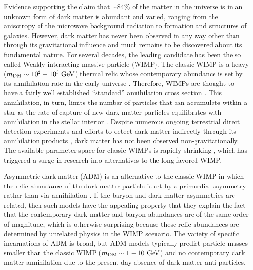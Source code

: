 \documentclass[useAMS,usenatbib]{mnras}
\begin{document}
  Evidence supporting the claim that $\sim$84\% of the matter in the universe is in 
  an unknown form of dark matter is abundant and varied, ranging from the 
  anisotropy of the microwave background radiation to formation and structures of galaxies. 
  However, dark matter has never been observed in any way other than through its 
  gravitational influence and much remains to be discovered about its fundamental nature. 
  For several decades, the leading candidate has been the so called Weakly-interacting massive particle (WIMP). 
  The classic WIMP is a heavy ($m_{\mathrm{DM}} \sim 10^2-10^3 \ \mathrm{GeV}$) thermal relic whose contemporary abundance is set 
  by its annihilation rate in the early universe . 
  Therefore, WIMPs are thought to have a fairly well established ``standard'' annihilation 
  cross section \citep[e.g.,][]{steigman_etal12}. This annihilation, in turn, limits the number of particles 
  that can accumulate within a star 
  as the rate of capture of new dark matter particles 
  equilibrates with annihilation in the stellar interior \citep{krauss_etal85}. 
  Despite numerous ongoing terrestrial direct detection experiments  and 
  efforts to detect dark matter indirectly through its annihilation products , 
  dark matter has not been observed non-gravitationally. The 
  available parameter space for classic WIMPs is rapidly shrinking 
  \citep{Amole16} , 
  which has triggered a surge in research into alternatives to the long-favored WIMP.


  Asymmetric dark matter (ADM) is an alternative to the classic WIMP in which 
  the relic abundance of the dark matter particle is set by a primordial asymmetry 
  rather than via annihilation \citep[for a review, see][and references therein]{adm_review}. 
  If the baryon and dark matter asymmetries are 
  related, then such models have the appealing property that they explain 
  the fact that the contemporary dark matter and baryon abundances are 
  of the same order of magnitude, which is otherwise surprising because 
  these relic abundances are determined by unrelated physics in the WIMP 
  scenario. The variety of specific incarnations of ADM is broad, 
  but ADM models typically predict particle masses smaller than 
  the classic WIMP ($m_{\mathrm{DM}} \sim 1-10 \ \mathrm{GeV}$) and no contemporary 
  dark matter annihilation due to the present-day absence of 
  dark matter anti-particles. 
  
\end{document}

